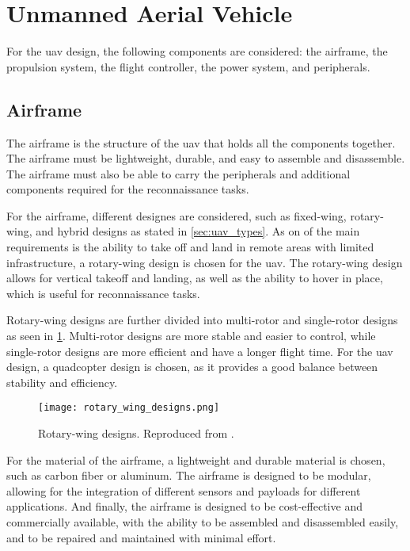 \section{Unmanned Aerial Vehicle}\label{sec:design_uav}

For the \gls{uav} design, the following components are considered: the airframe, the propulsion system, the flight controller, the power system, and peripherals.

\subsection{Airframe}

The airframe is the structure of the \gls{uav} that holds all the components together. The airframe must be lightweight, durable, and easy to assemble and disassemble. The airframe must also be able to carry the peripherals and additional components required for the reconnaissance tasks.

For the airframe, different designes are considered, such as fixed-wing, rotary-wing, and hybrid designs as stated in \cref{sec:uav_types}. As on of the main requirements is the ability to take off and land in remote areas with limited infrastructure, a rotary-wing design is chosen for the \gls{uav}. The rotary-wing design allows for vertical takeoff and landing, as well as the ability to hover in place, which is useful for reconnaissance tasks.

Rotary-wing designs are further divided into multi-rotor and single-rotor designs as seen in \cref{fig:rotary_wing_designs}. Multi-rotor designs are more stable and easier to control, while single-rotor designs are more efficient and have a longer flight time. For the \gls{uav} design, a quadcopter design is chosen, as it provides a good balance between stability and efficiency.

\begin{figure}
  \texttt{[image: rotary\_wing\_designs.png]}
  \caption{Rotary-wing designs. Reproduced from \autocite{rotary_wing_designs}.
  }\label{fig:rotary_wing_designs}
\end{figure}

For the material of the airframe, a lightweight and durable material is chosen, such as carbon fiber or aluminum. The airframe is designed to be modular, allowing for the integration of different sensors and payloads for different applications. And finally, the airframe is designed to be cost-effective and commercially available, with the ability to be assembled and disassembled easily, and to be repaired and maintained with minimal effort.


